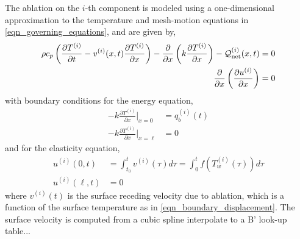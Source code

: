 The ablation on the $i$-th component is modeled using a one-dimensional approximation to the temperature and mesh-motion equations in \cref{eqn_governing_equations}, and are given by,
\begin{subequations}
    \begin{align}
        \rho c_p\left(\frac{\partial T^{(i)}}{\partial t} - v^{(i)}(x,t)\frac{\partial T^{(i)}}{\partial x}\right) - \frac{\partial}{\partial x}\left(k\frac{\partial T^{(i)}}{\partial x}\right) - \mathcal{Q}^{(i)}_{\text{net}}(x,t) &= 0\label{eqn_thermal_1d}\\
        \frac{\partial}{\partial x}\left(\frac{\partial u^{(i)}}{\partial x}\right) &= 0\label{eqn_elasticity_1d}
    \end{align}\label{eqn_rpm}
\end{subequations}
with boundary conditions for the energy equation,
\begin{subequations}
    \begin{align}
        -k\frac{\partial T^{(i)}}{\partial x}\Bigg|_{x=0} &= q^{(i)}_b(t)\\
        -k\frac{\partial T^{(i)}}{\partial x}\Bigg|_{x=\ell} &= 0
    \end{align}
\end{subequations}
and for the elasticity equation,
\begin{subequations}
    \begin{align}
        u^{(i)}(0,t) &= \int_{t_0}^{t}v^{(i)}(\tau)d\tau = \int_{0}^{t} f(T^{(i)}_w(\tau))d\tau\\
        u^{(i)}(\ell,t) &= 0
    \end{align}
\end{subequations}
where $v^{(i)}(t)$ is the surface receding velocity due to ablation, which is a function of the surface temperature as in \cref{eqn_boundary_displacement}. The surface velocity is computed from a cubic spline interpolate to a B' look-up table...

